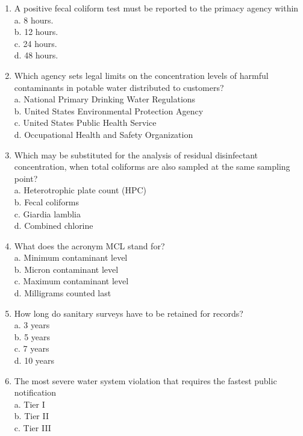 \begin{enumerate}
\item A positive fecal coliform test must be reported to the primacy agency within\\
a. 8 hours.\\
b. 12 hours.\\
c. 24 hours.\\
d. 48 hours.\\
\item Which agency sets legal limits on the concentration levels of harmful contaminants in potable water distributed to customers?\\
a. National Primary Drinking Water Regulations\\
b. United States Environmental Protection Agency\\
c. United States Public Health Service\\
d. Occupational Health and Safety Organization\\
\item Which may be substituted for the analysis of residual disinfectant concentration, when total coliforms are also sampled at the same sampling point?\\
a. Heterotrophic plate count (HPC)\\
b. Fecal coliforms\\
c. Giardia lamblia\\
d. Combined chlorine\\
\item What does the acronym MCL stand for?\\
a. Minimum contaminant level\\
b. Micron contaminant level\\
c. Maximum contaminant level\\
d. Milligrams counted last\\
\item How long do sanitary surveys have to be retained for records?\\
a. 3 years\\
b. 5 years\\
c. 7 years\\
d. 10 years\\
\item The most severe water system violation that requires the fastest public notification\\
a. Tier I\\
b. Tier II\\
c. Tier III\\

\end{enumerate}
